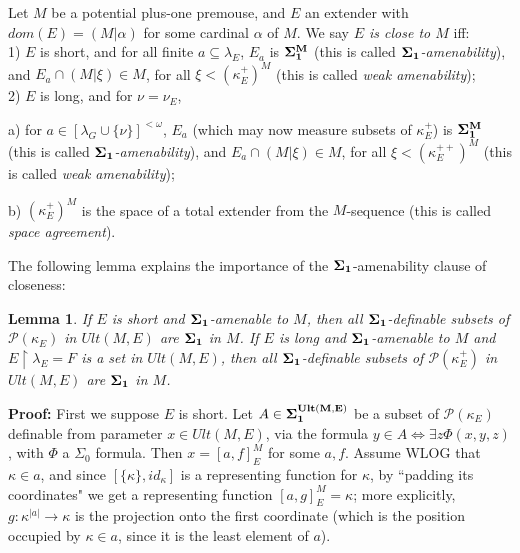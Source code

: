 \documentclass[12pt]{article}
\newtheorem{lem}[thm]{Lemma}
\begin{document}
\begin{def} \label{closeness}
Let $M$ be a potential plus-one premouse, and $E$ an extender with $dom(E) = (M | \alpha )$ for some cardinal $\alpha$ of $M$.  We say \textit{$E$ is close to $M$} iff:\\

	1) $E$ is short, and for all finite $a \subseteq \lambda_E$, $E_a$ is $\bf{\Sigma}_1^M$ (this is called \textit{$\bf{\Sigma}_1$-amenability}), and $E_a \cap (M | \xi ) \in M$, for all $\xi < (\kappa_E^+ )^M$ (this is called \textit{weak amenability});\\
	
	2) $E$ is long, and for $\nu = \nu_E$,
	
	\indent \indent a) for $a \in [ \lambda_G \cup \{ \nu \} ] ^{< \omega}$, $E_a$ (which may now measure subsets of $\kappa_E^+$) is $\bf{\Sigma}_1^M$ (this is called \textit{$\bf{\Sigma}_1$-amenability}), and $E_a \cap (M | \xi ) \in M$, for all $\xi < (\kappa_E^{++} )^M$ (this is called \textit{weak amenability});
	
	\indent \indent b) $(\kappa_E^+ )^M$ is the space of a total extender from the $M$-sequence (this is called \textit{space agreement}).
\end{def}
	
	

The following lemma explains the importance of the $\bf{\Sigma}_1$-amenability clause of closeness:\\

\begin{lem} If $E$ is short and $\bf{\Sigma}_1$-amenable to $M$, then all $\bf{\Sigma}_1$-definable subsets of $\mathcal{P} (\kappa_E)$ in $Ult(M, E)$ are $\bf{\Sigma}_1$ in $M$.  If $E$ is long and $\bf{\Sigma}_1$-amenable to $M$ and $E \restriction \lambda_E = F$ is a set in $Ult(M, E)$, then all $\bf{\Sigma}_1$-definable subsets of $\mathcal{P} (\kappa_E^+)$ in $Ult(M, E)$ are $\bf{\Sigma}_1$ in $M$.
\end{lem}


\textbf{Proof:} First we suppose $E$ is short.  Let $A \in \bf{\Sigma}_1^{Ult(M, E)}$ be a subset of $\mathcal{P} ( \kappa_E )$ definable from parameter $x \in Ult(M, E)$, via the formula $y \in A \Longleftrightarrow \exists z \Phi ( x, y, z )$, with $\Phi$ a $\Sigma_0$ formula.  Then $x = [a , f ]_E^M$ for some $a, f$.  Assume WLOG that $\kappa \in a$, and since $[ \{ \kappa \} , id_\kappa ] $ is a representing function for $\kappa$, by ``padding its coordinates" we get a representing function $[ a , g ]_E^M =\kappa$; more explicitly, $g: \kappa^{|a|} \longrightarrow \kappa$ is the projection onto the first coordinate (which is the position occupied by $\kappa \in a$, since it is the least element of $a$).\\
\end{document}
